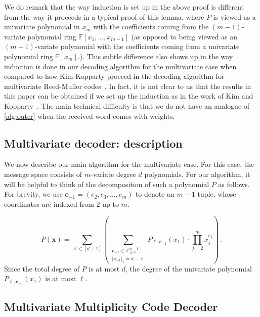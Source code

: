 \documentclass{theoretics}
\def\Integer{\mathbb{Z}}
\def\Field{\mathbb{F}}
\let\Z\Integer
\let\F\Field
\def\vece{\mathbf{e}}
\def\vecx{\mathbf{x}}
\newcommand{\vx}{\vecx}
\newcommand{\ve}{\vece}
\begin{document}
	We do remark that the way induction is set up in the above proof is different from the way it proceeds in a typical proof of this lemma, where $P$ is viewed as a univariate polynomial in $x_m$ with the coefficients coming from the $(m-1)$-variate polynomial ring $\F[x_1, \ldots, x_{m-1}]$ (as opposed to being viewed as an $(m-1)$-variate polynomial with the coefficients coming from a univariate polynomial ring $\F[x_m]$.). This subtle difference also shows up in the way induction is done in our decoding algorithm for the multivariate case when compared to how Kim-Kopparty proceed in the decoding algorithm for multivariate Reed-Muller codes~\cite{KimK2017}. In fact, it is not clear to us that the results in this paper can be obtained if we set up the induction as in the work of Kim and Kopparty~\cite{KimK2017}. The main technical difficulty is that we do not have an analogue of \cref{alg:outer} when the received word comes with weights. 
	
	
	\subsection{Multivariate decoder: description}
	
	We now describe our main algorithm for the multivariate case. For this case, the message space consists of $m$-variate degree $d$ polynomials. For our algorithm, it will be helpful to think of the decomposition of such a polynomial $P$ as follows. For brevity, we use $\ve_{-1} = (e_2, e_3, \ldots, e_m)$ to denote an $m-1$ tuple, whose coordinates are indexed from $2$ up to $m$.
	
	\[
	P(\vx) = \sum_{\ell \in [d+1]} \left( \sum_{\substack{\ve_{-1} \in \Z_{\geq 0}^{m-1} \\ |\ve_{-1}|_{1} = d-\ell}} P_{\ell, \ve_{-1}}(x_1)\cdot \prod_{j = 2}^m x_j^{e_j} \right) \, .
	\]
	Since the total degree of $P$ is at most $d$, the degree of the univariate polynomial $P_{\ell, \ve_{-1}}(x_1)$ is at most $\ell$. 
	
	\subsection*{Multivariate Multiplicity Code Decoder}
	
\end{document}

